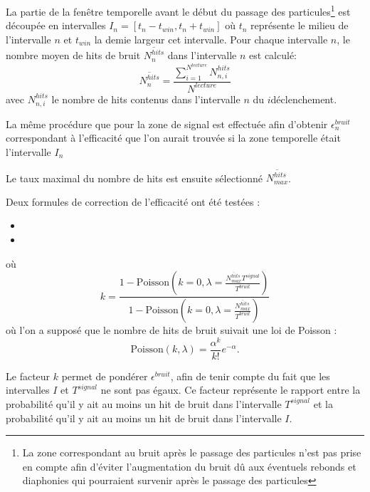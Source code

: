La partie de la fenêtre temporelle avant le début du passage des particules\footnote{La zone correspondant au bruit après le passage des particules n'est pas prise en compte afin d'éviter l'augmentation du bruit dû aux éventuels rebonds et diaphonies qui pourraient survenir après le passage des particules} est découpée en intervalles $I_{n}=\left[t_{n}-t_{win},t_{n}+t_{win}\right]$ où $t_{n}$ représente le milieu de l'intervalle $n$ et $t_{win}$ la demie largeur cet intervalle. Pour chaque intervalle $n$, le nombre moyen de hits de bruit $\overline{N^{hits}_n}$ dans l'intervalle $n$ est calculé:
\begin{equation}
\overline{N^{hits}_n}=\frac{\sum\limits_{i=1}^{N^{lecture}} N^{hits}_{n,i}}{N^{lecture}}
\end{equation}
avec $N^{hits}_{n,i}$ le nombre de hits contenus dans l'intervalle $n$ du $i$\ieme déclenchement.

La même procédure que pour la zone de signal est effectuée afin d'obtenir $\epsilon^{bruit}_n$ correspondant à l'efficacité que l'on aurait trouvée si la zone temporelle était l'intervalle $I_{n}$

Le taux maximal du nombre de hits est ensuite sélectionné $\overline{N^{hits}_{max}}$.

\newpage
Deux formules de correction de l'efficacité ont été testées :
\begin{itemize}[label=$\bullet$]
	\vspace{0.3cm}
	\item {}
	\vspace{0.3cm}
	\item {}
\end{itemize}
où 
\begin{equation}
k=\frac{1-\mbox{Poisson}\left(k=0,\lambda=\frac{\overline{N^{hits}_{max}}T^{signal}}{T^{bruit}}\right)}{1-\mbox{Poisson}\left(k=0,\lambda=\frac{\overline{N^{hits}_{max}}}{T^{bruit}}\right)}
\end{equation}
où l'on a supposé que le nombre de hits de bruit suivait une loi de Poisson :
\begin{equation}
\mbox{Poisson}\left(k,\lambda\right)=\frac{\alpha^k}{k!}e^{-\alpha}. 
\end{equation} 

Le facteur $k$ permet de pondérer $\epsilon^{bruit}$, afin de tenir compte du fait que les intervalles $I$ et $T^{signal}$ ne sont pas égaux. Ce facteur représente le rapport entre la probabilité qu'il y ait au moins un hit de bruit dans l'intervalle $T^{signal}$ et la probabilité qu'il y ait au moins un hit de bruit dans l'intervalle $I$.

